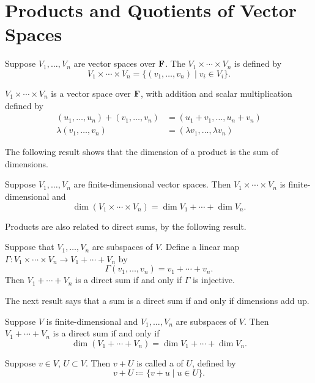 \section{Products and Quotients of Vector Spaces}
\begin{definition}[Product]
Suppose $V_1,\dots,V_n$ are vector spaces over $\mathbf F$. The  $V_1\times\cdots\times V_n$ is defined by
\[V_1\times\cdots\times V_n=\{(v_1,\dots,v_n)\mid v_i\in V_i\}.\]
\end{definition}

\begin{proposition}
$V_1\times\cdots\times V_n$ is a vector space over $\mathbf F$, with addition and scalar multiplication defined by
\begin{align*}
(u_1,\dots,u_n)+(v_1,\dots,v_n)&=(u_1+v_1,\dots,u_n+v_n)\\
\lambda(v_1,\dots,v_n)&=(\lambda v_1,\dots,\lambda v_n)
\end{align*}
\end{proposition}

The following result shows that the dimension of a product is the sum of dimensions.

\begin{proposition}
Suppose $V_1,\dots,V_n$ are finite-dimensional vector spaces. Then $V_1\times\cdots\times V_n$ is finite-dimensional and
\[\dim(V_1\times\cdots\times V_n)=\dim V_1+\cdots+\dim V_n.\]
\end{proposition}

Products are also related to direct sums, by the following result.

\begin{lemma}
Suppose that $V_1,\dots,V_n$ are subspaces of $V$. Define a linear map $\Gamma:V_1\times\cdots\times V_n\to V_1+\cdots+V_n$ by
\[\Gamma(v_1,\dots,v_n)=v_1+\cdots+v_n.\]
Then $V_1+\cdots+V_n$ is a direct sum if and only if $\Gamma$ is injective.
\end{lemma}

The next result says that a sum is a direct sum if and only if dimensions add up.

\begin{proposition}
Suppose $V$ is finite-dimensional and $V_1,\dots,V_n$ are subspaces of $V$. Then $V_1+\cdots+V_n$ is a direct sum if and only if
\[\dim(V_1+\cdots+V_n)=\dim V_1+\cdots+\dim V_n.\]
\end{proposition}

\begin{definition}[Coset]
Suppose $v\in V$, $U\subset V$. Then $v+U$ is called a  of $U$, defined by
\[v+U\coloneqq\{v+u\mid u\in U\}.\]
\end{definition}

